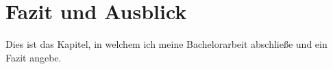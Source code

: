 \chapter{Fazit und Ausblick} %
\label{Conclusion} %

Dies ist das Kapitel, in welchem ich meine Bachelorarbeit abschließe und ein Fazit angebe.